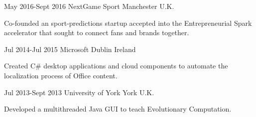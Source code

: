 \documentclass[10pt]{CurriculumVitae}
\begin{document}
      {May 2016-Sept 2016}
      {NextGame Sport} 
      {Manchester}
      {U.K.}
      {
        \item Co-founded an sport-predictions startup accepted into the
          Entrepreneurial Spark accelerator that sought to connect fans and brands together.
      }
  
      {Jul 2014-Jul 2015}
      {Microsoft} 
      {Dublin}
      {Ireland}
      {
        \item Created C\# desktop applications and cloud components to automate the localization
        process of Office content.
      }
    
      {Jul 2013-Sept 2013}
      {University of York}
      {York}
      {U.K.}
      {
        \item Developed a multithreaded Java GUI to teach Evolutionary Computation.
      } 
\end{document}
